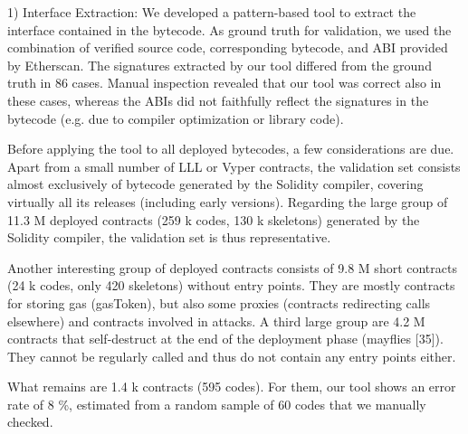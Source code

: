 \documentclass[12pt]{article}
\begin{document}
1) Interface Extraction: We developed a pattern-based tool
to extract the interface contained in the bytecode. As ground
truth for validation, we used the combination of verified
source code, corresponding bytecode, and ABI provided by
Etherscan. The signatures extracted by our tool differed from
the ground truth in 86 cases. Manual inspection revealed that
our tool was correct also in these cases, whereas the ABIs did
not faithfully reflect the signatures in the bytecode (e.g. due
to compiler optimization or library code).\par
Before applying the tool to all deployed bytecodes, a
few considerations are due. Apart from a small number of
LLL or Vyper contracts, the validation set consists almost
exclusively of bytecode generated by the Solidity compiler,
covering virtually all its releases (including early versions).
Regarding the large group of 11.3 M deployed contracts (259 k
codes, 130 k skeletons) generated by the Solidity compiler, the
validation set is thus representative.\par
Another interesting group of deployed contracts consists
of 9.8 M short contracts (24 k codes, only 420 skeletons)
without entry points. They are mostly contracts for storing
gas (gasToken), but also some proxies (contracts redirecting
calls elsewhere) and contracts involved in attacks. A third large
group are 4.2 M contracts that self-destruct at the end of the
deployment phase (mayflies [35]). They cannot be regularly
called and thus do not contain any entry points either.\par
What remains are 1.4 k contracts (595 codes). For them,
our tool shows an error rate of 8 \%, estimated from a random
sample of 60 codes that we manually checked.\\
\end{document}
